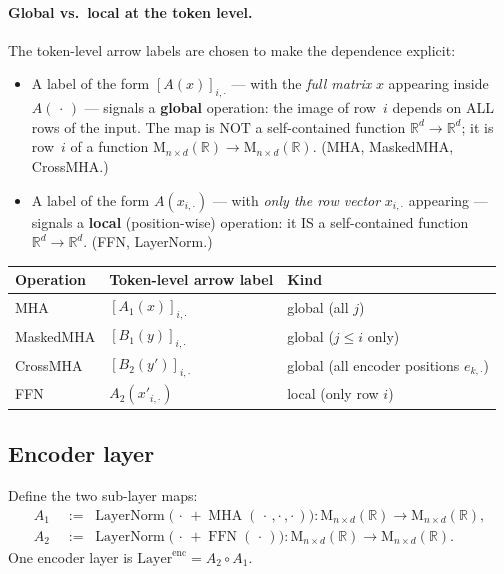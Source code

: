 \documentclass[11pt]{amsart}
\theoremstyle{plain}
\theoremstyle{definition}
\newcommand{\R}{\mathbb{R}}
\newcommand{\Mat}[2]{\mathrm{M}_{#1 \times #2}(\R)}
\newcommand{\MHA}{\operatorname{MHA}}
\newcommand{\LayerNorm}{\operatorname{LayerNorm}}
\newcommand{\FFN}{\operatorname{FFN}}
\begin{document}
\paragraph{Global vs.\ local at the token level.}
The token-level arrow labels are chosen to make the dependence explicit:
\begin{itemize}
  \item A label of the form $[A(x)]_{i,\cdot}$ --- with the \emph{full matrix}
  $x$ appearing inside $A(\,\cdot\,)$ --- signals a \textbf{global} operation:
  the image of row~$i$ depends on ALL rows of the input.  The map is NOT a
  self-contained function $\R^d\to\R^d$; it is row~$i$ of a function
  $\Mat{n}{d}\to\Mat{n}{d}$.  (MHA, MaskedMHA, CrossMHA.)
  \item A label of the form $A(x_{i,\cdot})$ --- with \emph{only the
  row vector} $x_{i,\cdot}$ appearing --- signals a \textbf{local}
  (position-wise) operation: it IS a self-contained function
  $\R^d\to\R^d$.  (FFN, LayerNorm.)
\end{itemize}

\begin{center}
\renewcommand{\arraystretch}{1.2}
\begin{tabular}{lll}
\hline
Operation & Token-level arrow label & Kind \\
\hline
MHA        & $[A_1(x)]_{i,\cdot}$  & global (all $j$) \\
MaskedMHA  & $[B_1(y)]_{i,\cdot}$  & global ($j\leq i$ only) \\
CrossMHA   & $[B_2(y')]_{i,\cdot}$ & global (all encoder positions $e_{k,\cdot}$) \\
FFN        & $A_2(x'_{i,\cdot})$   & local (only row $i$) \\
\hline
\end{tabular}
\end{center}

\subsection*{Encoder layer}

Define the two sub-layer maps:
\begin{align*}
    A_1 &\;:=\; \LayerNorm\!\bigl(\,\cdot\, + \MHA(\,\cdot\,,\cdot\,,\cdot\,)\bigr)
        : \Mat{n}{d} \to \Mat{n}{d}, \\
    A_2 &\;:=\; \LayerNorm\!\bigl(\,\cdot\, + \FFN(\,\cdot\,)\bigr)
        : \Mat{n}{d} \to \Mat{n}{d}.
\end{align*}
One encoder layer is $\mathrm{Layer}^{\mathrm{enc}} = A_2 \circ A_1$.
\end{document}
